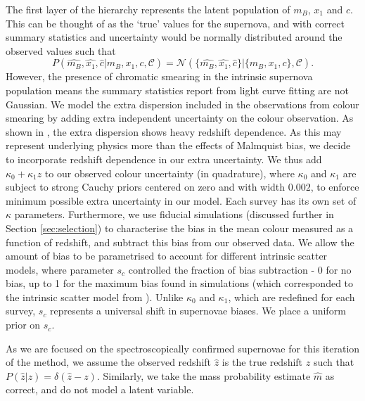 \documentclass[a4paper,fleqn,usenatbib]{mnras}
\newcommand{\cov}{\mathcal{C}}
\begin{document}
The first layer of the hierarchy represents the latent population of $m_B$, $x_1$ and $c$. This can be thought of as the `true' values for the supernova, and with correct summary statistics and uncertainty would be normally distributed around the observed values such that 
\begin{equation}
P(\hat{m_B},\hat{x_1},\hat{c}|m_B, x_1, c,\cov) = \mathcal{N}(\lbrace \hat{m_B},\hat{x_1},\hat{c} \rbrace|\lbrace m_B, x_1, c \rbrace, \cov). \label{eq:pop}
\end{equation}
However, the presence of chromatic smearing in the intrinsic supernova population \citep{Guy2010, Chotard2011} means the summary statistics report from light curve fitting are not Gaussian. We model the extra dispersion included in the observations from colour smearing by adding extra independent uncertainty on the colour observation. As shown in \citep{Kessler2013}, the extra dispersion shows heavy redshift dependence. As this may represent underlying physics more than the effects of Malmquist bias, we decide to incorporate redshift dependence in our extra uncertainty. We thus add $\kappa_0 + \kappa_1 z$ to our observed colour uncertainty (in quadrature), where $\kappa_0$ and $\kappa_1$ are subject to strong Cauchy priors centered on zero and with width $0.002$, to enforce minimum possible extra uncertainty in our model. Each survey has its own set of $\kappa$ parameters. Furthermore, we use fiducial simulations (discussed further in Section \ref{sec:selection}) to characterise the bias in the mean colour measured as a function of redshift, and subtract this bias from our observed data. We allow the amount of bias to be parametrised to account for different intrinsic scatter models, where parameter $s_c$ controlled the fraction of bias subtraction - 0 for no bias, up to 1 for the maximum bias found in simulations (which corresponded to the intrinsic scatter model from \citet{Chotard2011}). Unlike $\kappa_0$ and $\kappa_1$, which are redefined for each survey, $s_c$ represents a universal shift in supernovae biases. We place a uniform prior on $s_c$.

As we are focused on the spectroscopically confirmed supernovae for this iteration of the method, we assume the observed redshift $\hat{z}$ is the true redshift $z$ such that $P(\hat{z}|z) = \delta(\hat{z} - z)$. Similarly, we take the mass probability estimate $\hat{m}$ as correct, and do not model a latent variable.
\end{document}
